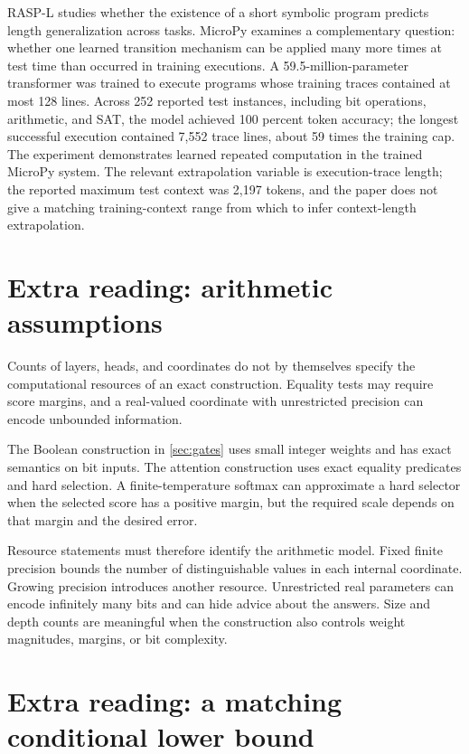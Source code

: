 \documentclass[11pt,twoside]{article}
\theoremstyle{definition}
\theoremstyle{remark}
\begin{document}
RASP-L studies whether the existence of a short symbolic program predicts
length generalization across tasks. MicroPy examines a complementary
question: whether one learned transition mechanism can be applied many more
times at test time than occurred in training executions. A
59.5-million-parameter transformer was trained to execute programs whose
training traces contained at most 128 lines. Across
252 reported test instances, including bit operations, arithmetic, and SAT,
the model achieved 100 percent token accuracy; the longest successful
execution contained 7,552 trace lines, about 59 times the training cap. The
experiment demonstrates learned repeated computation in the trained MicroPy
system. The relevant extrapolation variable is execution-trace length; the reported
maximum test context was 2,197 tokens, and the paper does not give a matching
training-context range from which to infer context-length extrapolation.

\section{Extra reading: arithmetic assumptions}
\label{sec:arithmetic}

Counts of layers, heads, and coordinates do not by themselves specify the
computational resources of an exact construction. Equality tests may require
score margins, and a real-valued coordinate with unrestricted precision can
encode unbounded information.

The Boolean construction in \cref{sec:gates} uses small integer weights and
has exact semantics on bit inputs. The attention construction uses exact
equality predicates and hard selection. A finite-temperature softmax can
approximate a hard selector when the selected score has a positive margin,
but the required scale depends on that margin and the desired error.

Resource statements must therefore identify the arithmetic model. Fixed
finite precision bounds the number of distinguishable values in each internal
coordinate.
Growing precision introduces another resource. Unrestricted real parameters
can encode infinitely many bits and can hide advice about the answers. Size
and depth counts are meaningful when the construction also controls weight
magnitudes, margins, or bit complexity.

\section{Extra reading: a matching conditional lower bound}
\label{sec:lower-bound}
\end{document}
